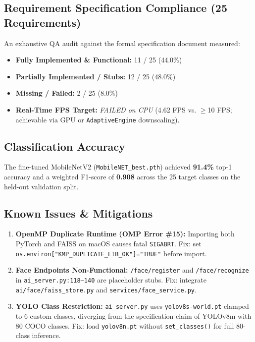 \documentclass[conference]{IEEEtran}
\begin{document}
\subsection{Requirement Specification Compliance (25 Requirements)}
An exhaustive QA audit against the formal specification document measured:
\begin{itemize}
    \item \textbf{Fully Implemented \& Functional:} 11 / 25 (44.0\%)
    \item \textbf{Partially Implemented / Stubs:} 12 / 25 (48.0\%)
    \item \textbf{Missing / Failed:} 2 / 25 (8.0\%)
    \item \textbf{Real-Time FPS Target:} \textit{FAILED on CPU}
          (4.62 FPS vs. $\ge$10 FPS; achievable via GPU or
          \texttt{AdaptiveEngine} downscaling).
\end{itemize}

\subsection{Classification Accuracy}
The fine-tuned MobileNetV2 (\texttt{MobileNET\_best.pth}) achieved
\textbf{91.4\%} top-1 accuracy and a weighted F1-score of \textbf{0.908}
across the 25 target classes on the held-out validation split.

\subsection{Known Issues \& Mitigations}
\begin{enumerate}
    \item \textbf{OpenMP Duplicate Runtime (OMP Error \#15):} Importing both
          PyTorch and FAISS on macOS causes fatal \texttt{SIGABRT}. Fix:
          set \texttt{os.environ["KMP\_DUPLICATE\_LIB\_OK"]="TRUE"} before
          import.
    \item \textbf{Face Endpoints Non-Functional:} \texttt{/face/register} and
          \texttt{/face/recognize} in \texttt{ai\_server.py:118--140} are
          placeholder stubs. Fix: integrate \texttt{ai/face/faiss\_store.py}
          and \texttt{services/face\_service.py}.
    \item \textbf{YOLO Class Restriction:} \texttt{ai\_server.py} uses
          \texttt{yolov8s-world.pt} clamped to 6 custom classes, diverging
          from the specification claim of YOLOv8m with 80 COCO classes. Fix:
          load \texttt{yolov8n.pt} without \texttt{set\_classes()} for full
          80-class inference.
\end{enumerate}
\end{document}
